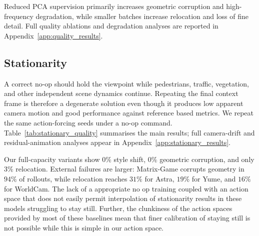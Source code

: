 \documentclass[letterpaper]{article} %
\begin{document}
Reduced PCA supervision primarily increases geometric corruption and
high-frequency degradation, while smaller batches increase relocation and loss
of fine detail. Full quality ablations and degradation analyses are reported in
Appendix~\ref{app:quality_results}.

\subsection{Stationarity}
\label{sec:stationarity}

A correct no-op should hold the viewpoint while pedestrians, traffic,
vegetation, and other independent scene dynamics continue. Repeating the final
context frame is therefore a degenerate solution even though it produces low
apparent camera motion and good performance against reference based metrics.
We repeat the same action-forcing seeds under a no-op command.
Table~\ref{tab:stationary_quality} summarises the main results; full
camera-drift and residual-animation analyses appear in
Appendix~\ref{app:stationary_results}.

Our full-capacity variants show $0\%$ style
shift, $0\%$ geometric corruption, and only $3\%$ relocation. External
failures are larger: Matrix-Game corrupts geometry in $94\%$ of rollouts,
while relocation reaches $31\%$ for Astra, $19\%$ for Yume, and $16\%$ for
WorldCam. The lack of a appropriate no op training coupled with an action space that does not easily permit interpolation of stationarity results in these models struggling to stay still. Further, the clunkiness of the action spaces provided by most of these baselines mean that finer calibration of staying still is not possible while this is simple in our action space.
\end{document}
